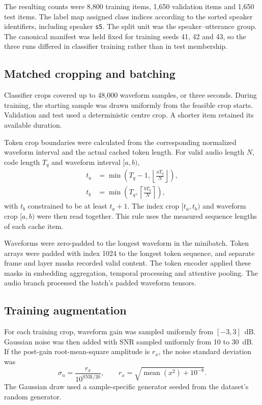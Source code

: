 The resulting counts were 8,800 training items, 1,650 validation items and 1,650 test items. The label map assigned class indices according to the sorted speaker identifiers, including speaker \texttt{s5}. The split unit was the speaker--utterance group. The canonical manifest was held fixed for training seeds 41, 42 and 43, so the three runs differed in classifier training rather than in test membership.

\subsection{Matched cropping and batching}
Classifier crops covered up to 48,000 waveform samples, or three seconds. During training, the starting sample was drawn uniformly from the feasible crop starts. Validation and test used a deterministic centre crop. A shorter item retained its available duration.

Token crop boundaries were calculated from the corresponding normalized waveform interval and the actual cached token length. For valid audio length $N$, code length $T_q$ and waveform interval $[a,b)$,
\begin{align}
 t_a&=\min\left(T_q-1,\left\lfloor\frac{aT_q}{N}\right\rfloor\right),
 \nonumber\\
 t_b&=\min\left(T_q,\left\lceil\frac{bT_q}{N}\right\rceil\right),
 \label{eq:sv2-crop}
\end{align}
with $t_b$ constrained to be at least $t_a+1$. The index crop $[t_a,t_b)$ and waveform crop $[a,b)$ were then read together. This rule uses the measured sequence lengths of each cache item.

Waveforms were zero-padded to the longest waveform in the minibatch. Token arrays were padded with index 1024 to the longest token sequence, and separate frame and layer masks recorded valid content. The token encoder applied these masks in embedding aggregation, temporal processing and attentive pooling. The audio branch processed the batch's padded waveform tensors.

\subsection{Training augmentation}
For each training crop, waveform gain was sampled uniformly from $[-3,3]$~dB. Gaussian noise was then added with SNR sampled uniformly from 10 to 30~dB. If the post-gain root-mean-square amplitude is $r_x$, the noise standard deviation was
\begin{equation}
 \sigma_n=\frac{r_x}{10^{\mathrm{SNR}/20}},
 \qquad
 r_x=\sqrt{\operatorname{mean}(x^2)+10^{-8}}.
 \label{eq:sv2-noise}
\end{equation}
The Gaussian draw used a sample-specific generator seeded from the dataset's random generator.

